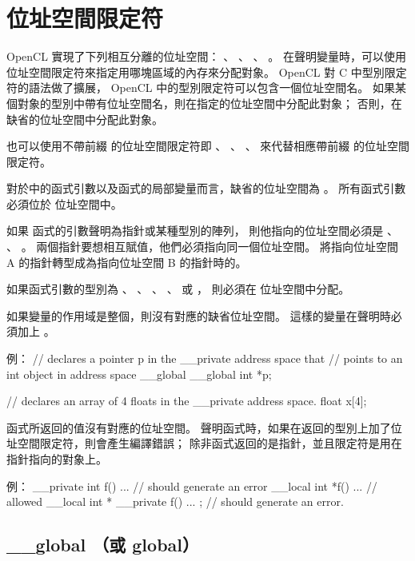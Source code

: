 \section{位址空間限定符}

OpenCL 實現了下列相互分離的位址空間：
 、 、
 、 。
在聲明變量時，可以使用位址空間限定符來指定用哪塊區域的內存來分配對象。
 OpenCL 對 C 中型別限定符的語法做了擴展， OpenCL 中的型別限定符可以包含一個位址空間名。
如果某個對象的型別中帶有位址空間名，則在指定的位址空間中分配此對象；
否則，在缺省的位址空間中分配此對象。

也可以使用不帶前綴 \cqlf{__} 的位址空間限定符即
 、 、 、 
 來代替相應帶前綴 \cqlf{__} 的位址空間限定符。

對於中的函式引數以及函式的局部變量而言，缺省的位址空間為 。
所有函式引數必須位於  位址空間中。

如果  函式的引數聲明為指針或某種型別的陣列，
則他指向的位址空間必須是 、 、 。
兩個指針要想相互賦值，他們必須指向同一個位址空間。
將指向位址空間 A 的指針轉型成為指向位址空間 B 的指針時的。

如果函式引數的型別為
 、 、 、
 、  或 ，
則必須在  位址空間中分配。

如果變量的作用域是整個，則沒有對應的缺省位址空間。
這樣的變量在聲明時必須加上 。

例：
\startclc
// declares a pointer p in the __private address space that
// points to an int object in address space __global
__global int *p;

// declares an array of 4 floats in the __private address space.
float x[4];
\stopclc

函式所返回的值沒有對應的位址空間。
聲明函式時，如果在返回的型別上加了位址空間限定符，則會產生編譯錯誤；
除非函式返回的是指針，並且限定符是用在指針指向的對象上。

例：
\startclc
__private int f() { ... } // should generate an error
__local int *f() { ... } // allowed
__local int * __private f() { ... }; // should generate an error.
\stopclc

\subsection{__global （或 global）}

